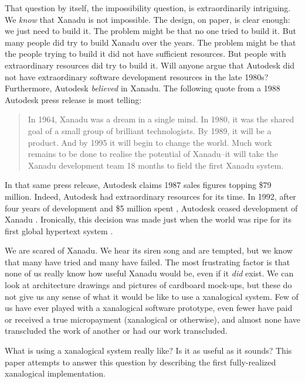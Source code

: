 \documentclass{acm_proc_article-sp}
\begin{document}
That question by itself, the impossibility question, is extraordinarily intriguing.  We {\it know} that Xanadu is not impossible.  
The design, on paper, is clear enough:  we just need to build it.  
The problem might be that no one tried to build it.  
But many people did try to build Xanadu over the years.  
The problem might be that the people trying to build it did not have sufficient resources.  But people with extraordinary resources did try to build it.  
Will anyone argue that Autodesk did not have extraordinary software development resources in the late 1980s?  
Furthermore, Autodesk {\it believed} in Xanadu.  
The following quote from a 1988 Autodesk press release is most telling:

\begin{quote}
In 1964, Xanadu was a dream in a single mind.  In 1980, it was the
shared goal of a small group of brilliant technologists.  By 1989, it
will be a product.  And by 1995 it will begin to change the world.
Much work remains to be done to realise the potential of Xanadu--it
will take the Xanadu development team 18 months to field the first
Xanadu system. \cite{AutodeskPress} 
\end{quote}

In that same press release, Autodesk claims 1987 sales figures topping \$79 million.  
Indeed, Autodesk had extraordinary resources for its time.  
In 1992, after four years of development and \$5 million spent \cite{AutodeskCost},  Autodesk ceased development of Xanadu \cite{AutodeskPressDrop}.  
Ironically, this decision was made just when the world was ripe for its first global hypertext system \cite{BernersLee92}.

We are scared of Xanadu.  
We hear its siren song and are tempted, but we know that many have tried and many have failed.  
The most frustrating factor is that none of us really know how useful Xanadu would be, even if it {\it did} exist.  
We can look at architecture drawings and pictures of cardboard mock-ups\cite{Nelson1999}, but these do not give us any sense of what it would be like to use a xanalogical system.  
Few of us have ever played with a xanalogical software prototype, even fewer have paid or received a true micropayment (xanalogical or otherwise), and almost none have transcluded the work of another or had our work transcluded.

What is using a xanalogical system really like?
Is it as useful as it sounds?  
This paper attempts to answer this question by describing the first fully-realized xanalogical implementation.
\end{document}
